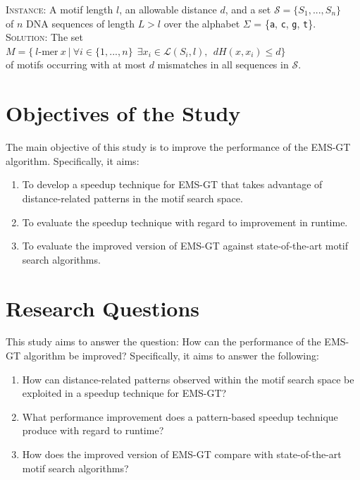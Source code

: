\documentclass[oneside,12pt]{DISCSthesis}
\begin{document}
		\newline
		\noindent \textsc{Instance:} A motif length $l$, an allowable distance $d$, and a set $\mathcal{S} = \{S_{1},..., S_{n}\}$\\
		\noindent\hspace*{55pt}of $n$ DNA sequences of length $L > l$ over the alphabet $\Sigma$ = \{\texttt{a}, \texttt{c}, \texttt{g}, \texttt{t}\}.\newline
		\noindent \textsc{Solution:} The set $M = \{\ l\text{-mer}\ x\ |\ \forall i \in \{1,...,n\}\ \ \exists x_i \in \mathcal{L}(S_i,l),\ \ dH(x, x_i) \leq d \}$\\
		\noindent\hspace*{55pt}of motifs occurring with at most $d$ mismatches in all sequences in $\mathcal{S}$.
		\newpage

	\section{Objectives of the Study}
		The main objective of this study is to improve the performance of the EMS-GT algorithm. Specifically, it aims:
		\begin{enumerate}
		\item To develop a speedup technique for EMS-GT that takes advantage of distance-related patterns in the motif search space.
		\item To evaluate the speedup technique with regard to improvement in runtime. %
		\item To evaluate the improved version of EMS-GT against state-of-the-art motif search algorithms.
		\end{enumerate}

	\section{Research Questions}
		This study aims to answer the question: How can the performance of the EMS-GT algorithm be improved?
		Specifically, it aims to answer the following:

		\begin{enumerate}
		\item How can distance-related patterns observed within the motif search space be exploited in a speedup technique for EMS-GT?
		\item What performance improvement does a pattern-based speedup technique produce with regard to runtime? %
		\item How does the improved version of EMS-GT compare with state-of-the-art motif search algorithms?
		\end{enumerate}
\end{document}

